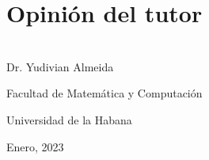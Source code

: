 \chapter*{Opinión del tutor}


\vspace{1cm}

 \begin{flushright}
   \underline{\hspace{6.5cm}}\\
   Dr. Yudivian Almeida
   
   Facultad de Matemática y Computación
   
   Universidad de la Habana
   
   Enero, 2023
 \end{flushright}